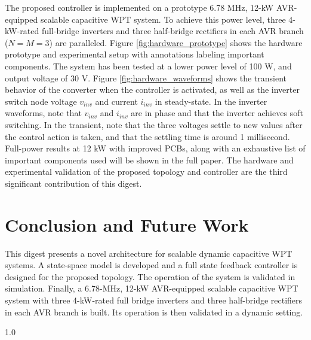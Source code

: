 \documentclass[journal, onecolumn, final, letterpaper, 11pt]{IEEEtran}
\begin{document}
The proposed controller is implemented on a prototype 6.78 MHz, 12-kW AVR-equipped scalable capacitive WPT system. To achieve this power level, three 4-kW-rated full-bridge inverters and three half-bridge rectifiers in each AVR branch ($N = M = 3$) are paralleled. Figure \ref{fig:hardware_prototype} shows the hardware prototype and experimental setup with annotations labeling important components. The system has been tested at a lower power level of 100 W, and output voltage of 30 V. Figure \ref{fig:hardware_waveforms} shows the transient behavior of the converter when the controller is activated, as well as the inverter switch node voltage $v_{inv}$ and current $i_{inv}$ in steady-state. In the inverter waveforms, note that $v_{inv}$ and $i_{inv}$ are in phase and that the inverter achieves soft switching. In the transient, note that the three voltages settle to new values after the control action is taken, and that the settling time is around 1 millisecond. Full-power results at 12 kW with improved PCBs, along with an exhaustive list of important components used will be shown in the full paper. The hardware and experimental validation of the proposed topology and controller are the third significant contribution of this digest.

\vspace{-0.25cm}

\section{Conclusion and Future Work}
\label{sec:conclusion}

\vspace{-0.25cm}

This digest presents a novel architecture for scalable dynamic capacitive WPT systems. A state-space model is developed and a full state feedback controller is designed for the proposed topology. The operation of the system is validated in simulation. Finally, a 6.78-MHz, 12-kW AVR-equipped scalable capacitive WPT system with three 4-kW-rated full bridge inverters and three half-bridge rectifiers in each AVR branch is built. Its operation is then validated in a dynamic setting.

\newpage

\footnotesize
\begin{spacing}{1.0}


\end{spacing}
\end{document}
